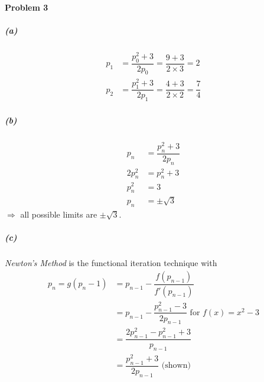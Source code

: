 \documentclass{article}
\begin{document}
\paragraph{Problem 3}
\subparagraph*{(a)}
\begin{equation}\nonumber
\begin{split}
p_{1} &= \dfrac{p_{0}^2+3}{2p_{0}}=\dfrac{9+3}{2\times3}=2 \\
p_{2} &= \dfrac{p_{1}^2+3}{2p_{1}}=\dfrac{4+3}{2\times2}=\dfrac{7}{4}
\end{split}
\end{equation} 
\subparagraph*{(b)}
\begin{equation}\nonumber
\begin{split}
p_{n}&=\dfrac{p_{n}^2+3}{2p_{n}} \\
2p_{n}^2 &= p_{n}^2+3\\
p_{n}^2 &= 3 \\
p_{n}&=\pm\sqrt{3}
\end{split}
\end{equation} 
$\Rightarrow$ all possible limits are $\pm\sqrt{3}$.
\subparagraph*{(c)} \textit{Newton's Method} is the functional iteration technique with \\
\begin{equation}\nonumber
\begin{split}
p_{n} = g(p_{n}-1)&=p_{n-1}-\dfrac{f(p_{n-1})}{{f}'(p_{n-1})} \\
&=p_{n-1} - \dfrac{p_{n-1}^2-3}{2p_{n-1}} \text{ for } f(x) = x^2-3 \\
&=\dfrac{2p_{n-1}^2-p_{n-1}^2+3}{p_{n-1}} \\
&=\dfrac{p_{n-1}^2+3}{2p_{n-1}} \text{ (shown)}
\end{split}
\end{equation} 
\end{document}

